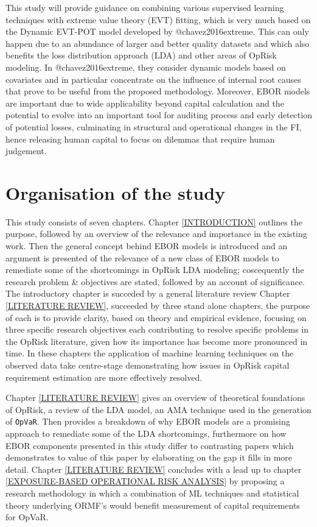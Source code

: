 \documentclass[]{article}
\begin{document}
This study will provide guidance on combining various supervised
learning techniques with extreme value theory (EVT) fitting, which is
very much based on the Dynamic EVT-POT model developed by
@chavez2016extreme. This can only happen due to an abundance of larger
and better quality datasets and which also benefits the loss
distribution approach (LDA) and other areas of OpRisk modeling. In
@chavez2016extreme, they consider dynamic models based on covariates and
in particular concentrate on the influence of internal root causes that
prove to be useful from the proposed methodology. Moreover, EBOR models
are important due to wide applicability beyond capital calculation and
the potential to evolve into an important tool for auditing process and
early detection of potential losses, culminating in structural and
operational changes in the FI, hence releasing human capital to focus on
dilemmas that require human judgement.

\section{Organisation of the study}
\label{sec:Organisation of the study}

This study consists of seven chapters. Chapter \ref{INTRODUCTION}
outlines the purpose, followed by an overview of the relevance and
importance in the existing work. Then the general concept behind EBOR
models is introduced and an argument is presented of the relevance of a
new class of EBOR models to remediate some of the shortcomings in OpRisk
LDA modeling; coscequently the research problem \& objectives are
stated, followed by an account of significance. The introductory chapter
is succeded by a general literature review Chapter
\ref{LITERATURE REVIEW}, succeeded by three stand alone chapters, the
purpose of each is to provide clarity, based on theory and empirical
evidence, focusing on three specific research objectives each
contributing to resolve specific problems in the OpRisk literature,
given how its importance has become more pronounced in time. In these
chapters the application of machine learning techniques on the observed
data take centre-stage demonstrating how issues in OpRisk capital
requirement estimation are more effectively resolved.\medskip

Chapter \ref{LITERATURE REVIEW} gives an overview of theoretical
foundations of OpRisk, a review of the LDA model, an AMA technique used
in the generation of \texttt{OpVaR}. Then provides a breakdown of why
EBOR models are a promising approach to remediate some of the LDA
shortcomings, furthermore on how EBOR components presented in this study
differ to contrasting papers which demonstrates to value of this paper
by elaborating on the gap it fills in more detail. Chapter
\ref{LITERATURE REVIEW} concludes with a lead up to chapter
\ref{EXPOSURE-BASED OPERATIONAL RISK ANALYSIS} by proposing a research
methodology in which a combination of ML techniques and statistical
theory underlying ORMF's would benefit measurement of capital
requirements for OpVaR.\medskip
\end{document}
